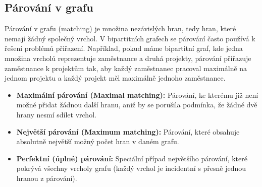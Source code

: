\subsection{Párování v grafu} 
Párování v grafu (matching) je množina nezávislých hran, tedy hran, které nemají žádný společný vrchol. V bipartitních grafech se párování často používá k řešení problémů přiřazení. Například, pokud máme bipartitní graf, kde jedna množina vrcholů reprezentuje zaměstnance a druhá projekty, párování přiřazuje zaměstnance k projektům tak, aby každý zaměstnanec pracoval maximálně na jednom projektu a každý projekt měl maximálně jednoho zaměstnance.

\begin{itemize}
\item \textbf{Maximální párování (Maximal matching):} Párování, ke kterému již není možné přidat žádnou další hranu, aniž by se porušila podmínka, že žádné dvě hrany nesmí sdílet vrchol.
\item \textbf{Největší párování (Maximum matching):} Párování, které obsahuje absolutně největší možný počet hran v daném grafu.
\item \textbf{Perfektní (úplné) párování:} Speciální případ největšího párování, které pokrývá všechny vrcholy grafu (každý vrchol je incidentní s přesně jednou hranou z párování).
\end{itemize}

